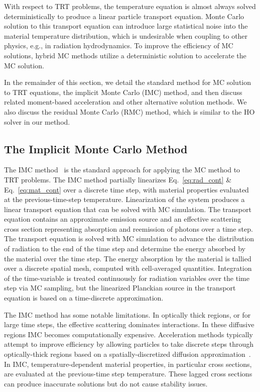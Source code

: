 With respect to TRT problems, the temperature equation is almost always solved
deterministically to produce a linear particle transport equation. Monte Carlo solution to
this transport equation can introduce large statistical
noise into the material temperature distribution, which is undesirable when coupling to
other physics, e.g., in radiation hydrodynamics.  To improve the efficiency of MC solutions, hybrid MC methods utilize a
deterministic solution to accelerate the MC solution.  

In the remainder of this section, we detail the standard method for MC solution to TRT
equations, the implicit Monte Carlo (IMC) method, and then discuss related moment-based acceleration and other
alternative solution methods.  We also discuss the residual Monte Carlo (RMC) method, which is
similar to the HO solver in our method.

\subsection{The Implicit Monte Carlo Method}
\label{sec:imc}

The IMC method~\cite{fnc,wollaber_review} is the standard approach for applying the MC
method to TRT problems.  The IMC method partially linearizes Eq.~\eqref{eq:rad_cont} \&
Eq.~\eqref{eq:mat_cont} over a discrete time step, with material properties evaluated at
the previous-time-step temperature.  Linearization of the system produces a linear
transport equation that can be solved with MC simulation.  The transport equation contains
an approximate emission source and an effective scattering cross section representing
absorption and reemission of photons over a time step.  The transport equation is solved
with MC simulation to advance the distribution of radiation to the end of the time step
and determine the energy absorbed by the material over the time step.  The energy
absorption by the material is tallied over a discrete spatial mesh, computed with
cell-averaged quantities.  Integration of the time-variable is treated continuously for
radiation variables over the time step via MC sampling, but the linearized Planckian
source in the transport equation is based on a time-discrete approximation. 

The IMC method has some notable limitations.  In optically thick regions, or for large time steps,
the effective scattering dominates interactions.  In these diffusive regions IMC becomes
computationally expensive. Acceleration methods typically attempt to improve efficiency by
allowing particles to take discrete steps through optically-thick regions based on a
spatially-discretized diffusion approximation~\cite{imd,ddmc}. 
In IMC, temperature-dependent material
properties, in particular cross sections, are evaluated at the previous-time step
temperature. These lagged cross sections can produce inaccurate solutions but do not cause
stability issues.  

